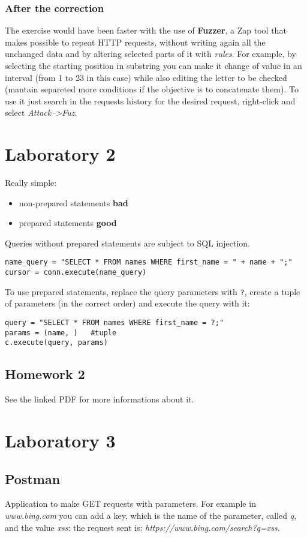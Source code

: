 \documentclass[a4paper, 10pt, titlepage]{article}
\begin{document}
\subsubsection{After the correction} 
The exercise would have been faster with the use of \textbf{Fuzzer}, a Zap tool that makes possible to repeat HTTP requests, without writing again all the unchanged data and by altering selected parts of it with \textit{rules}. For example, by selecting the starting position in substring you can make it change of value in an interval (from 1 to 23 in this case) while also editing the letter to be checked (mantain separeted more conditions if the objective is to concatenate them). To use it just search in the requests history for the desired request, right-click and select \textit{Attack-->Fuz}.

\section{Laboratory 2}
Really simple:
\begin{itemize}
\item non-prepared statements \textbf{bad}
\item prepared statements \textbf{good}
\end{itemize}
Queries without prepared statements are subject to SQL injection.
\begin{lstlisting}
name_query = "SELECT * FROM names WHERE first_name = " + name + ";"
cursor = conn.execute(name_query)
\end{lstlisting}
To use prepared statements, replace the query parameters with \lstinline|?|, create a tuple of parameters (in the correct order) and execute the query with it:
\begin{lstlisting}
query = "SELECT * FROM names WHERE first_name = ?;"
params = (name, )	#tuple
c.execute(query, params)
\end{lstlisting}
\subsection{Homework 2}
See the linked PDF for more informations about it. 
	
\section{Laboratory 3}
\subsection{Postman}
Application to make GET requests with parameters. For example in \textit{www.bing.com} you can add a key, which is the name of the parameter, called \textit{q}, and the value \textit{xss}: the request sent is: \textit{https://www.bing.com/search?q=xss}.
\end{document}

